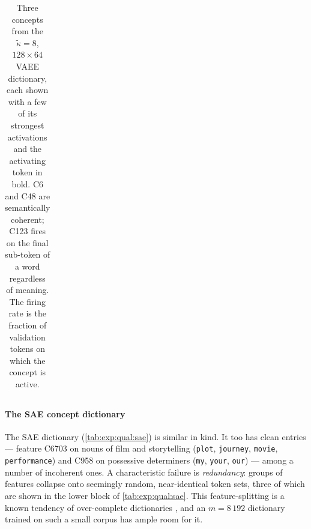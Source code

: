 \begin{table}[tb]
\begin{tabularx}{\linewidth}{@{}>{\ttfamily}X@{}}
        \bottomrule
    \end{tabularx}
    \caption[\acs{VAEE} concept dictionary]{
        Three concepts from the $\tilde{\kappa} = 8$, $128 \times 64$ \ac{VAEE}
        dictionary, each shown with a few of its strongest activations and the
        activating token in bold. C6 and C48 are semantically coherent; C123
        fires on the final sub-token of a word regardless of meaning. The firing
        rate is the fraction of validation tokens on which the concept is
        active.
    }
    \label{tab:exp:qual:vaee}
\end{table}

\paragraph{The SAE concept dictionary} The \ac{SAE} dictionary
(\cref{tab:exp:qual:sae})
is similar in kind. It too has clean entries --- feature C6703 on nouns of film
and storytelling (\texttt{plot}, \texttt{journey}, \texttt{movie},
\texttt{performance}) and C958 on possessive determiners (\texttt{my},
\texttt{your}, \texttt{our}) --- among a number of incoherent ones. A
characteristic failure is \textit{redundancy}: groups of features collapse onto
seemingly random, near-identical token sets, three of which are shown in the
lower block of
\cref{tab:exp:qual:sae}.
This feature-splitting is a known tendency of over-complete dictionaries
\citep{brickenMonosemanticityDecomposingLanguage2023,
templetonScalingMonosemanticityExtracting}, and an $m = 8\,192$ dictionary
trained on such a small corpus has ample room for it.

